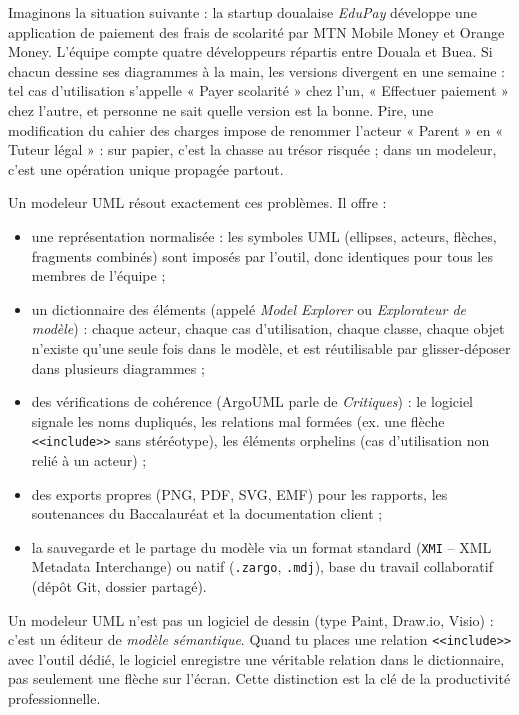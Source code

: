 \documentclass[11pt]{article}
\newcommand{\cle}[1]{{\popxbold\color{popdark}#1}}
\newcounter{popsec}
\newcounter{popsub}
\newcommand{\courssub}[1]{%
  \stepcounter{popsub}%
  \par\vspace{9pt}\noindent{\popxbold\fontsize{11.5}{13}\selectfont\color{popink}{\color{poporange}\thepopsec.\thepopsub}\hspace{6pt}#1}\par\nopagebreak\vspace{4pt}
}
\begin{document}
\courssub{Pourquoi un logiciel de modélisation ?}

Imaginons la situation suivante : la startup doualaise \emph{EduPay} développe une application de paiement des frais de scolarité par MTN Mobile Money et Orange Money. L'équipe compte quatre développeurs répartis entre Douala et Buea. Si chacun dessine ses diagrammes à la main, les versions divergent en une semaine : tel cas d'utilisation s'appelle « Payer scolarité » chez l'un, « Effectuer paiement » chez l'autre, et personne ne sait quelle version est la bonne. Pire, une modification du cahier des charges impose de renommer l'acteur « Parent » en « Tuteur légal » : sur papier, c'est la chasse au trésor risquée ; dans un modeleur, c'est une opération unique propagée partout.

Un modeleur UML résout exactement ces problèmes. Il offre :

\begin{itemize}
\item une \cle{représentation normalisée} : les symboles UML (ellipses, acteurs, flèches, fragments combinés) sont imposés par l'outil, donc identiques pour tous les membres de l'équipe ;
\item un \cle{dictionnaire des éléments} (appelé \emph{Model Explorer} ou \emph{Explorateur de modèle}) : chaque acteur, chaque cas d'utilisation, chaque classe, chaque objet n'existe qu'une seule fois dans le modèle, et est réutilisable par glisser-déposer dans plusieurs diagrammes ;
\item des \cle{vérifications de cohérence} (ArgoUML parle de \emph{Critiques}) : le logiciel signale les noms dupliqués, les relations mal formées (ex. une flèche \texttt{<<include>>} sans stéréotype), les éléments orphelins (cas d'utilisation non relié à un acteur) ;
\item des \cle{exports} propres (PNG, PDF, SVG, EMF) pour les rapports, les soutenances du Baccalauréat et la documentation client ;
\item la \cle{sauvegarde et le partage} du modèle via un format standard (\texttt{XMI} -- XML Metadata Interchange) ou natif (\texttt{.zargo}, \texttt{.mdj}), base du travail collaboratif (dépôt Git, dossier partagé).
\end{itemize}

\begin{aretenir}
Un modeleur UML n'est pas un logiciel de dessin (type Paint, Draw.io, Visio) : c'est un éditeur de \emph{modèle sémantique}. Quand tu places une relation \texttt{<<include>>} avec l'outil dédié, le logiciel enregistre une véritable relation dans le dictionnaire, pas seulement une flèche sur l'écran. Cette distinction est la clé de la productivité professionnelle.
\end{aretenir}
\end{document}
